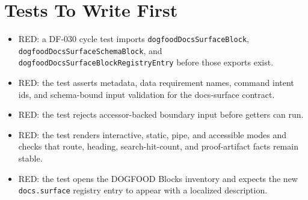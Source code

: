 \section{Tests To Write First}\label{record-091-tests-to-write-first}

\begin{itemize}
\tightlist
\item
  RED: a DF-030 cycle test imports \texttt{d\allowbreak{}o\allowbreak{}g\allowbreak{}f\allowbreak{}o\allowbreak{}o\allowbreak{}d\allowbreak{}D\allowbreak{}o\allowbreak{}c\allowbreak{}s\allowbreak{}S\allowbreak{}u\allowbreak{}r\allowbreak{}f\allowbreak{}a\allowbreak{}c\allowbreak{}e\allowbreak{}B\allowbreak{}l\allowbreak{}o\allowbreak{}c\allowbreak{}k}, \texttt{d\allowbreak{}o\allowbreak{}g\allowbreak{}f\allowbreak{}o\allowbreak{}o\allowbreak{}d\allowbreak{}D\allowbreak{}o\allowbreak{}c\allowbreak{}s\allowbreak{}S\allowbreak{}u\allowbreak{}r\allowbreak{}f\allowbreak{}a\allowbreak{}c\allowbreak{}e\allowbreak{}S\allowbreak{}c\allowbreak{}h\allowbreak{}e\allowbreak{}m\allowbreak{}a\allowbreak{}B\allowbreak{}l\allowbreak{}o\allowbreak{}c\allowbreak{}k}, and \texttt{d\allowbreak{}o\allowbreak{}g\allowbreak{}f\allowbreak{}o\allowbreak{}o\allowbreak{}d\allowbreak{}D\allowbreak{}o\allowbreak{}c\allowbreak{}s\allowbreak{}S\allowbreak{}u\allowbreak{}r\allowbreak{}f\allowbreak{}a\allowbreak{}c\allowbreak{}e\allowbreak{}B\allowbreak{}l\allowbreak{}o\allowbreak{}c\allowbreak{}k\allowbreak{}R\allowbreak{}e\allowbreak{}g\allowbreak{}i\allowbreak{}s\allowbreak{}t\allowbreak{}r\allowbreak{}y\allowbreak{}E\allowbreak{}n\allowbreak{}t\allowbreak{}r\allowbreak{}y} before those exports exist.
\item
  RED: the test asserts metadata, data requirement names, command intent ids, and schema-bound input validation for the docs-surface contract.
\item
  RED: the test rejects accessor-backed boundary input before getters can run.
\item
  RED: the test renders interactive, static, pipe, and accessible modes and checks that route, heading, search-hit-count, and proof-artifact facts remain stable.
\item
  RED: the test opens the DOGFOOD Blocks inventory and expects the new \texttt{d\allowbreak{}o\allowbreak{}c\allowbreak{}s\allowbreak{}.\allowbreak{}s\allowbreak{}u\allowbreak{}r\allowbreak{}f\allowbreak{}a\allowbreak{}c\allowbreak{}e} registry entry to appear with a localized description.
\end{itemize}

